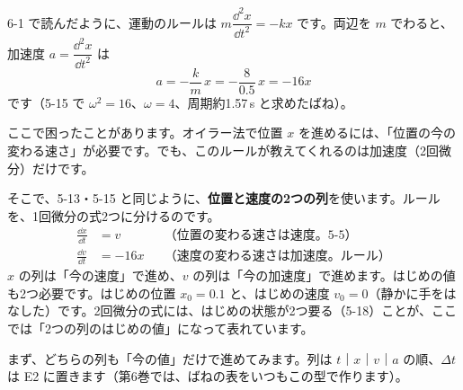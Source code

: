 6-1 で読んだように、運動のルールは $m\dfrac{\dd^2x}{\dd t^2}=-kx$ です。両辺を $m$ でわると、加速度 $a=\dfrac{\dd^2x}{\dd t^2}$ は
\[ a=-\frac{k}{m}\,x=-\frac{8}{0.5}\,x=-16x \]
です（5-15 で $\omega^2=16$、$\omega=4$、周期約1.57\,s と求めたばね）。

ここで困ったことがあります。オイラー法で位置 $x$ を進めるには、「位置の今の変わる速さ」が必要です。でも、このルールが教えてくれるのは加速度（2回微分）だけです。

そこで、5-13・5-15 と同じように、\textbf{位置と速度の2つの列}を使います。ルールを、1回微分の式2つに分けるのです。
\begin{align*}
\frac{\dd x}{\dd t}&=v &&\text{（位置の変わる速さは速度。5-5）}\\
\frac{\dd v}{\dd t}&=-16x &&\text{（速度の変わる速さは加速度。ルール）}
\end{align*}
$x$ の列は「今の速度」で進め、$v$ の列は「今の加速度」で進めます。はじめの値も2つ必要です。はじめの位置 $x_0=0.1$ と、はじめの速度 $v_0=0$（静かに手をはなした）です。2回微分の式には、はじめの状態が2つ要る（5-18）ことが、ここでは「2つの列のはじめの値」になって表れています。

まず、どちらの列も「今の値」だけで進めてみます。列は $t$｜$x$｜$v$｜$a$ の順、$\Delta t$ は E2 に置きます（第6巻では、ばねの表をいつもこの型で作ります）。
\begin{bkcenter}
\end{bkcenter}

